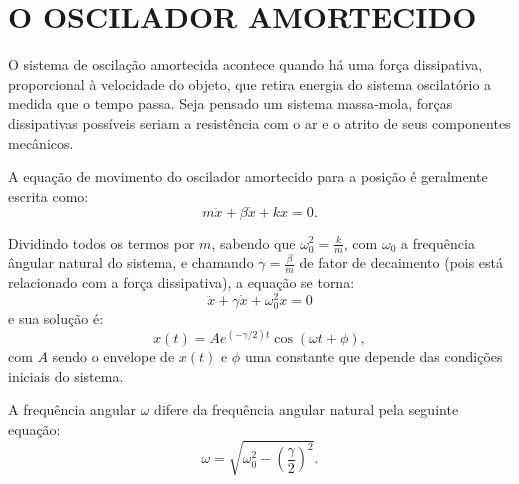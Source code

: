 \documentclass[10pt,a4paper,twocolumn]{article}
\begin{document}
\section{O OSCILADOR AMORTECIDO}
O sistema de oscilação amortecida acontece quando há uma força dissipativa, proporcional à velocidade do objeto, que retira energia do sistema oscilatório a medida que o tempo passa. Seja pensado um sistema massa-mola, forças dissipativas possíveis seriam a resistência com o ar e o atrito de seus componentes mecânicos. 
\par A equação de movimento do oscilador amortecido para a posição é geralmente escrita como:
\begin{equation}
m\ddot{x}+\beta\dot{x}+kx=0.
\end{equation}
\par Dividindo todos os termos por $m$, sabendo que $\omega_0^2=\frac{k}{m}$, com $\omega_0$ a frequência ângular natural do sistema, e chamando $\gamma=\frac{\beta}{m}$ de fator de decaimento (pois está relacionado com a força dissipativa), a equação se torna:
\begin{equation}
\ddot{x}+\gamma\dot{x}+\omega_0^2x=0
\end{equation}
e sua solução é:
\begin{equation}
x(t)=Ae^{(-\gamma/2)t}\cos(\omega t+\phi),
\label{eq:x}
\end{equation}
com $A$ sendo o envelope de $x(t)$ e $\phi$ uma constante que depende das condições iniciais do sistema.
\par A frequência angular $\omega$ difere da frequência angular natural pela seguinte equação:
\begin{equation}
\omega=\sqrt{\omega_0^2-(\frac{\gamma}{2})^2}.
\label{eq:omega}
\end{equation}
\end{document}
